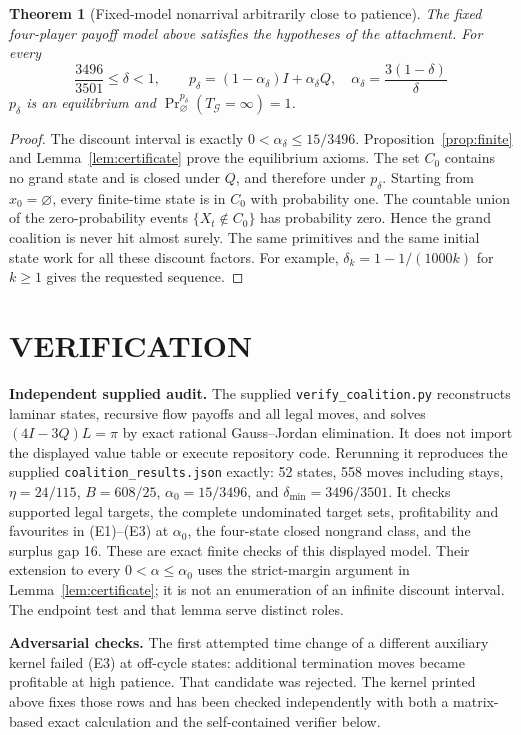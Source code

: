 \documentclass[11pt,a4paper]{article}
\newtheorem{theorem}{Theorem}[section]
\theoremstyle{definition}\newtheorem{definition}[theorem]{Definition}
\theoremstyle{remark}\newtheorem{remark}[theorem]{Remark}
\newcommand{\1}{\mathbf 1}
\begin{document}
\begin{theorem}[Fixed-model nonarrival arbitrarily close to patience]\label{thm:main}
The fixed four-player payoff model above satisfies the hypotheses of the attachment. For every
\[
 \boxed{\quad\frac{3496}{3501}\le\delta<1,\qquad
 p_\delta=(1-\alpha_\delta)I+\alpha_\delta Q,
 \quad \alpha_\delta=\frac{3(1-\delta)}{\delta}\quad}
\]
$p_\delta$ is an equilibrium and
$\Pr^{p_\delta}_{\varnothing}(T_{\mathcal G}=\infty)=1$.
\end{theorem}
\begin{proof}
The discount interval is exactly $0<\alpha_\delta\le15/3496$. Proposition~\ref{prop:finite} and Lemma~\ref{lem:certificate} prove the equilibrium axioms. The set $C_0$ contains no grand state and is closed under $Q$, and therefore under $p_\delta$. Starting from $x_0=\varnothing$, every finite-time state is in $C_0$ with probability one. The countable union of the zero-probability events $\{X_t\notin C_0\}$ has probability zero. Hence the grand coalition is never hit almost surely. The same primitives and the same initial state work for all these discount factors. For example, $\delta_k=1-1/(1000k)$ for $k\ge1$ gives the requested sequence.
\end{proof}

\section{VERIFICATION}
\textbf{Independent supplied audit.} The supplied
\texttt{verify\_coalition.py} reconstructs laminar states, recursive flow
payoffs and all legal moves, and solves $(4I-3Q)L=\pi$ by exact rational
Gauss--Jordan elimination. It does not import the displayed value table or
execute repository code. Rerunning it reproduces the supplied
\texttt{coalition\_results.json} exactly: 52 states, 558 moves including
stays, $\eta=24/115$, $B=608/25$, $\alpha_0=15/3496$, and
$\delta_{\min}=3496/3501$. It checks supported legal targets, the complete
undominated target sets, profitability and favourites in (E1)--(E3) at
$\alpha_0$, the four-state closed nongrand class, and the surplus gap 16.
These are exact finite checks of this displayed model. Their extension to
every $0<\alpha\le\alpha_0$ uses the strict-margin argument in
Lemma~\ref{lem:certificate}; it is not an enumeration of an infinite
discount interval. The endpoint test and that lemma serve distinct roles.

\textbf{Adversarial checks.} The first attempted time change of a different auxiliary kernel failed (E3) at off-cycle states: additional termination moves became profitable at high patience. That candidate was rejected. The kernel printed above fixes those rows and has been checked independently with both a matrix-based exact calculation and the self-contained verifier below.
\end{document}
